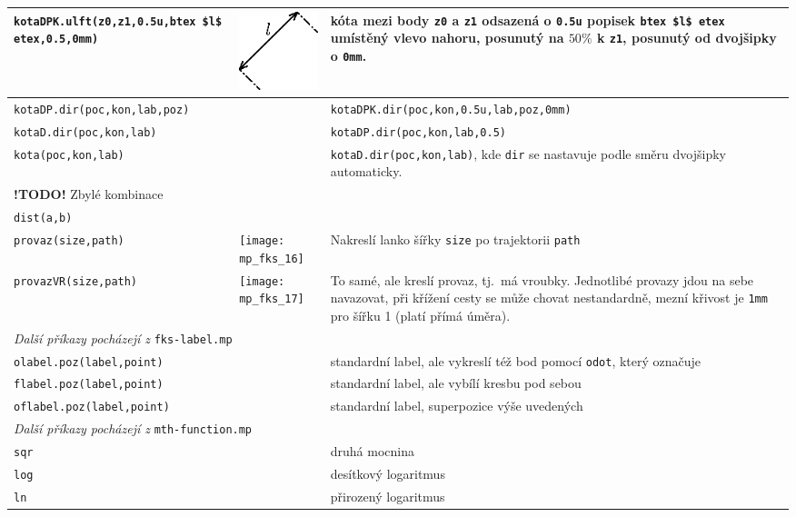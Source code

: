 \documentclass[a4paper,10pt]{article}
\begin{document}
\begin{tabularx}{\textwidth}{|l|l|X|}
    \verb+kotaDPK.ulft(z0,z1,0.5u,btex $l$ etex,0.5,0mm)+ &
	\raise-24pt\hbox{\includegraphics{mp_fks_15}} & 
	kóta mezi body \verb+z0+ a \verb+z1+ odsazená o \verb+0.5u+ popisek 
	\verb+btex $l$ etex+ umístěný vlevo nahoru, posunutý na $50\%$ 
	k \verb+z1+, posunutý od dvojšipky o \verb+0mm+.\\\hline
    \verb+kotaDP.dir(poc,kon,lab,poz)+ &&
	\verb+kotaDPK.dir(poc,kon,0.5u,lab,poz,0mm)+\\\hline
    \verb+kotaD.dir(poc,kon,lab)+ &&
	\verb+kotaDP.dir(poc,kon,lab,0.5)+\\\hline
    \verb+kota(poc,kon,lab)+ &&
	\verb+kotaD.dir(poc,kon,lab)+, kde \verb+dir+ se nastavuje podle
	směru dvojšipky automaticky.\\\hline
    {\bf !TODO!} Zbylé kombinace&&\\\hline
    \verb+dist(a,b)+&&\\\hline
    \verb+provaz(size,path)+&\texttt{[image: mp\_fks\_16]}&Nakreslí lanko šířky
	\verb+size+ po trajektorii \verb+path+\\\hline
    \verb+provazVR(size,path)+&\texttt{[image: mp\_fks\_17]}&To samé, ale kreslí
	provaz, tj.~má vroubky. Jednotlibé provazy jdou na sebe navazovat, 
	při křížení cesty se může chovat nestandardně, mezní křivost je 
	\verb+1mm+ pro šířku 1 (platí přímá úměra).\\\hline
    \multicolumn{3}{|l|}{\emph{Další příkazy pocházejí z} {\tt fks-label.mp}}\\\hline
    \verb+olabel.poz(label,point)+ & & 
	standardní label, ale vykreslí též bod pomocí \verb+odot+, 
	který označuje\\\hline
    \verb+flabel.poz(label,point)+ & & 
	standardní label, ale vybílí kresbu pod sebou\\\hline
    \verb+oflabel.poz(label,point)+ & & 
	standardní label, superpozice výše uvedených\\\hline
    \multicolumn{3}{|l|}{\emph{Další příkazy pocházejí z} 
	{\tt mth-function.mp}}\\\hline
    \verb+sqr+  && druhá mocnina\\\hline
    \verb+log+  && desítkový logaritmus\\\hline
    \verb+ln+   && přirozený logaritmus\\\hline

\end{tabularx}
\end{document}
